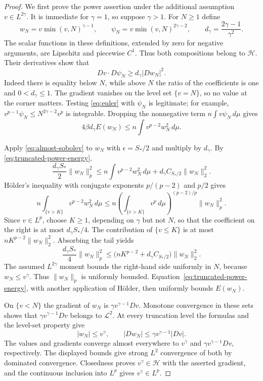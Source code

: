 \documentclass[11pt]{article}
\numberwithin{equation}{section}
\theoremstyle{definition}
\theoremstyle{remark}
\begin{document}
\begin{proof}
We first prove the power assertion under the additional assumption
$v\in L^{2\gamma}$.  It is immediate for $\gamma=1$, so suppose
$\gamma>1$.  For $N\ge1$ define
\[
 w_N=v\min(v,N)^{\gamma-1},\qquad
 \psi_N=v\min(v,N)^{2\gamma-2},\qquad
 d_\gamma=\frac{2\gamma-1}{\gamma^2}.
\]
The scalar functions in these definitions, extended by zero for
negative arguments, are Lipschitz and piecewise $C^1$.  Thus both
compositions belong to $\mathcal H$.  Their derivatives show that
\[
 Dv\cdot D\psi_N\ge d_\gamma|Dw_N|^2.
\]
Indeed there is equality below $N$, while above $N$ the ratio of
the coefficients is one and $0<d_\gamma\le1$.  The gradient vanishes
on the level set $\{v=N\}$, so no value at the corner matters.
Testing \eqref{eq:euler} with $\psi_N$ is legitimate; for example,
$v^{p-1}\psi_N\le N^{2\gamma-2}v^p$ is integrable.  Dropping the
nonnegative term $n\int v\psi_N\,d\mu$ gives
\begin{equation}
 4\beta d_\gamma E(w_N)
 \le n\int v^{p-2}w_N^2\,d\mu.
 \label{eq:truncated-power-energy}
\end{equation}

Apply \eqref{eq:almost-sobolev} to $w_N$ with $\epsilon=S_*/2$ and
multiply by $d_\gamma$.  By
\eqref{eq:truncated-power-energy},
\[
 \frac{d_\gamma S_*}{2}\|w_N\|_p^2
 \le n\int v^{p-2}w_N^2\,d\mu
       +d_\gamma C_{S_*/2}\|w_N\|_2^2.
\]
H\"older's inequality with conjugate exponents $p/(p-2)$ and $p/2$
gives
\[
 n\int_{\{v>K\}}v^{p-2}w_N^2\,d\mu
 \le n\left(\int_{\{v>K\}}v^p\,d\mu\right)^{(p-2)/p}
       \|w_N\|_p^2.
\]
Since $v\in L^p$, choose $K\ge1$, depending on $\gamma$ but not $N$,
so that the coefficient on the right is at most
$d_\gamma S_*/4$.  The contribution of $\{v\le K\}$ is at most
$nK^{p-2}\|w_N\|_2^2$.  Absorbing the tail yields
\[
 \frac{d_\gamma S_*}{4}\|w_N\|_p^2
 \le\bigl(nK^{p-2}+d_\gamma C_{S_*/2}\bigr)\|w_N\|_2^2.
\]
The assumed $L^{2\gamma}$ moment bounds the right-hand side uniformly
in $N$, because $w_N\le v^\gamma$.  Thus $\|w_N\|_p$ is uniformly
bounded.  Equation~\eqref{eq:truncated-power-energy}, with another
application of H\"older, then uniformly bounds $E(w_N)$.

On $\{v<N\}$ the gradient of $w_N$ is
$\gamma v^{\gamma-1}Dv$.  Monotone convergence in these sets shows
that $\gamma v^{\gamma-1}Dv$ belongs to $\mathcal L^2$.  At every
truncation level the formulas and the level-set property give
\[
 |w_N|\le v^\gamma,\qquad
 |Dw_N|\le\gamma v^{\gamma-1}|Dv|.
\]
The values and gradients converge almost everywhere to $v^\gamma$
and $\gamma v^{\gamma-1}Dv$, respectively.  The displayed bounds
give strong $L^2$ convergence of both by dominated convergence.
Closedness proves $v^\gamma\in\mathcal H$ with the asserted gradient,
and the continuous inclusion into $L^p$ gives $v^\gamma\in L^p$.


\end{proof}
\end{document}
